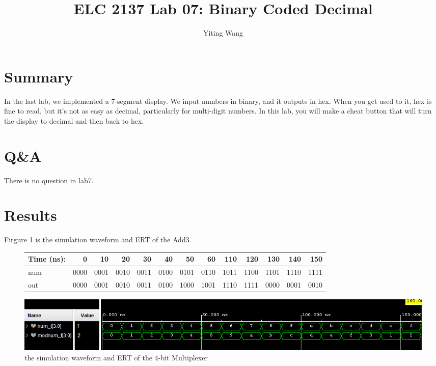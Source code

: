 \documentclass[11pt]{article}
\begin{document}
\title{ELC 2137 Lab 07: Binary Coded Decimal}
\author{Yiting Wang}

\maketitle


\section*{Summary}

In the last lab, we implemented a 7-segment display. We input numbers in binary, and it outputs in hex. When you get used to it, hex is fine to read, but it’s not as easy as decimal,  particularly for multi-digit numbers. In this lab, you will make a cheat button that will turn the display to decimal and then back to hex.  \\



\section*{Q\&A}

There is no question in lab7.\\



\section*{Results}

	Firgure 1 is the simulation waveform and ERT of the Add3.\\
	\begin{figure}[ht]\centering
		\begin{tabular}{l|rrrr|rrrr|rrrr}
			Time (ns): & 0 & 10 & 20 & 30 & 40 & 50 & 60 & 110 & 120 & 130 & 140 & 150 \\
			\midrule
			num & 0000 & 0001 & 0010 & 0011 & 0100 & 0101 & 0110 & 1011 & 1100 & 1101 & 1110 & 1111 \\
			\midrule
			out & 0000 & 0001 & 0010 & 0011 & 0100 & 1000 & 1001 & 1110 & 1111 & 0000 & 0001 & 0010 \\
			\bottomrule
		\end{tabular}\medskip
		
		\includegraphics[width=1\textwidth]{add3_simulate}
		\caption{the simulation waveform and ERT of the 4-bit Multiplexer}
		\label{fig:add3_simulate}
	\end{figure}
\end{document}

